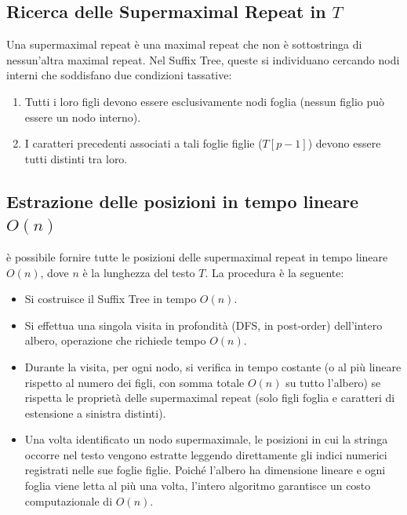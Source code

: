 \documentclass[a4paper,11pt]{article}
\begin{document}
\subsection{Ricerca delle Supermaximal Repeat in $T$}
Una supermaximal repeat è una maximal repeat che non è sottostringa di nessun'altra maximal repeat.
Nel Suffix Tree, queste si individuano cercando nodi interni che soddisfano due condizioni tassative:
\begin{enumerate}
    \item Tutti i loro figli devono essere esclusivamente nodi foglia (nessun figlio può essere un nodo interno).
    \item I caratteri precedenti associati a tali foglie figlie ($T[p-1]$) devono essere tutti distinti tra loro.
\end{enumerate}

\subsection{Estrazione delle posizioni in tempo lineare $O(n)$}
è possibile fornire tutte le posizioni delle supermaximal repeat in tempo lineare $O(n)$, dove $n$ è la lunghezza del testo $T$.
La procedura è la seguente:
\begin{itemize}
    \item Si costruisce il Suffix Tree in tempo $O(n)$.
    \item Si effettua una singola visita in profondità (DFS, in post-order) dell'intero albero, operazione che richiede tempo $O(n)$.
    \item Durante la visita, per ogni nodo, si verifica in tempo costante (o al più lineare rispetto al numero dei figli, con somma totale $O(n)$ su tutto l'albero) se rispetta le proprietà delle supermaximal repeat (solo figli foglia e caratteri di estensione a sinistra distinti).
    \item Una volta identificato un nodo supermaximale, le posizioni in cui la stringa occorre nel testo vengono estratte leggendo direttamente gli indici numerici registrati nelle sue foglie figlie. Poiché l'albero ha dimensione lineare e ogni foglia viene letta al più una volta, l'intero algoritmo garantisce un costo computazionale di $O(n)$.
\end{itemize}
\end{document}
